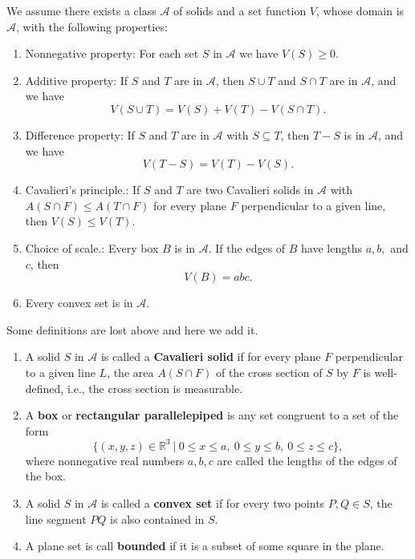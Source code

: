 \documentclass[a4paper]{ctexart}
\begin{document}
	\begin{mydef}
		We assume there exists a class $\mathcal{A}$ of solids and a set function $V$, whose domain is $\mathcal{A}$, with the following properties:
		\begin{enumerate}
			\item Nonnegative property: For each set $S$ in $\mathcal{A}$ we have $V(S) \ge 0$.
			
			\item Additive property: If $S$ and $T$ are in $\mathcal{A}$, then 
			$S \cup T$ and $S \cap T$ are in $\mathcal{A}$, and we have
			\[
				V(S \cup T) = V(S) + V(T) - V(S \cap T).
			\]
			
			\item Difference property: If $S$ and $T$ are in $\mathcal{A}$ with $S \subseteq T$, 
			then $T - S$ is in $\mathcal{A}$, and we have 
			\[
				V(T - S) = V(T) - V(S).
			\]
			
			\item Cavalieri's principle.: If $S$ and $T$ are two Cavalieri solids in $\mathcal{A}$ 
			with $A(S \cap F) \le A(T \cap F)$ for every plane $F$ perpendicular to a given line, 
			then $V(S) \le V(T)$.
			
			\item Choice of scale.: Every box $B$ is in $\mathcal{A}$. 
			If the edges of $B$ have lengths $a, b,$ and $c$, then 
			\[
				V(B) = abc.
			\]
			
			\item Every convex set is in $\mathcal{A}$.
		\end{enumerate}
	\end{mydef}
	\begin{mydef}[Additional]
		Some definitions are lost above and here we add it.
		\begin{enumerate}
			\item A solid $S$ in $\mathcal{A}$ is called a \textbf{Cavalieri solid} if for every plane $F$ perpendicular to a given line $L$, the area $A(S\cap F)$ of the cross section of $S$ by $F$ is well-defined, i.e., the cross section is measurable.
			\item A \textbf{box} or \textbf{rectangular parallelepiped} is any set congruent to a set of the form
			\[
			\{(x,y,z)\in \mathbb{R}^3\ |\ 0\le x \le a,\ 0\le y \le b,\ 0\le z \le c \},
			\]
			where nonnegative real numbers $a,b,c$ are called the lengths of the edges of the box.
			\item A solid $S$ in $\mathcal{A}$ is called a \textbf{convex set} if for every two points $P,Q\in S$, the line segment $PQ$ is also contained in $S$.
			\item A plane set is call \textbf{bounded} if it is a subset of some square in the plane.
		\end{enumerate}
	\end{mydef}
\end{document}

